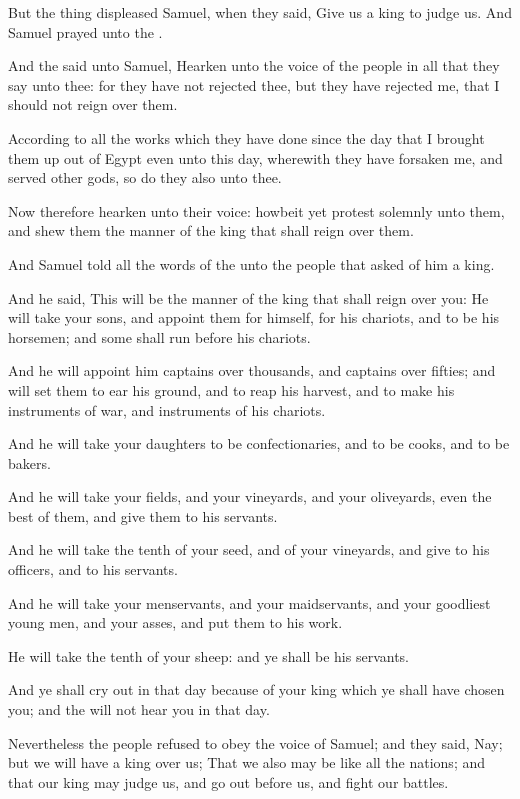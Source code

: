 \Verse But the thing displeased Samuel, when they said, Give us a king to judge us. And Samuel prayed unto the \LORD.

\Verse And the \LORD said unto Samuel, Hearken unto the voice of the people in all that they say unto thee: for they have not rejected thee, but they have rejected me, that I should not reign over them.

\Verse According to all the works which they have done since the day that I brought them up out of Egypt even unto this day, wherewith they have forsaken me, and served other gods, so do they also unto thee.

\Verse Now therefore hearken unto their voice: howbeit yet protest solemnly unto them, and shew them the manner of the king that shall reign over them.

\Verse And Samuel told all the words of the \LORD unto the people that asked of him a king.

\Verse And he said, This will be the manner of the king that shall reign over you: He will take your sons, and appoint them for himself, for his chariots, and to be his horsemen; and some shall run before his chariots.

\Verse And he will appoint him captains over thousands, and captains over fifties; and will set them to ear his ground, and to reap his harvest, and to make his instruments of war, and instruments of his chariots.

\Verse And he will take your daughters to be confectionaries, and to be cooks, and to be bakers.

\Verse And he will take your fields, and your vineyards, and your oliveyards, even the best of them, and give them to his servants.

\Verse And he will take the tenth of your seed, and of your vineyards, and give to his officers, and to his servants.

\Verse And he will take your menservants, and your maidservants, and your goodliest young men, and your asses, and put them to his work.

\Verse He will take the tenth of your sheep: and ye shall be his servants.

\Verse And ye shall cry out in that day because of your king which ye shall have chosen you; and the \LORD will not hear you in that day.

\Verse Nevertheless the people refused to obey the voice of Samuel; and they said, Nay; but we will have a king over us; \Verse That we also may be like all the nations; and that our king may judge us, and go out before us, and fight our battles.

